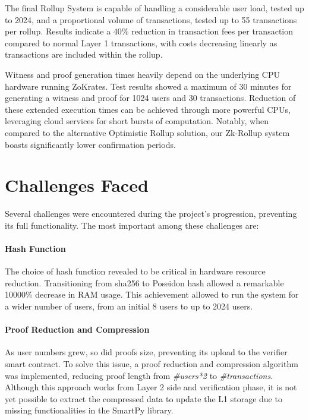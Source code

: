 The final Rollup System is capable of handling a considerable user load, tested up to 2024, and a proportional volume of transactions, tested up to 55 transactions per rollup. Results indicate a 40\% reduction in transaction fees per transaction compared to normal Layer 1 transactions, with costs decreasing linearly as transactions are included within the rollup.

Witness and proof generation times heavily depend on the underlying CPU hardware running ZoKrates. Test results showed a maximum of 30 minutes for generating a witness and proof for 1024 users and 30 transactions. Reduction of these extended execution times can be achieved through more powerful CPUs, leveraging cloud services for short bursts of computation. Notably, when compared to the alternative Optimistic Rollup solution, our Zk-Rollup system boasts significantly lower confirmation periods.

\section{Challenges Faced}

Several challenges were encountered during the project's progression, preventing its full functionality. The most important among these challenges are:
\vspace{-0.11in}
\paragraph{Hash Function} The choice of hash function revealed to be critical in hardware resource reduction. Transitioning from sha256 to Poseidon hash allowed a remarkable 10000\% decrease in RAM usage. This achievement allowed to run the system for a wider number of users, from an initial 8 users to up to 2024 users.
\vspace{-0.11in}
\paragraph{Proof Reduction and Compression} As user numbers grew, so did proofs size, preventing its upload to the verifier smart contract. To solve this issue, a proof reduction and compression algorithm was implemented, reducing proof length from \textit{\#users*2} to \textit{\#transactions}. Although this approach works from Layer 2 side and verification phase, it is not yet possible to extract the compressed data to update the L1 storage due to missing functionalities in the SmartPy library.
\vspace{-0.11in}
